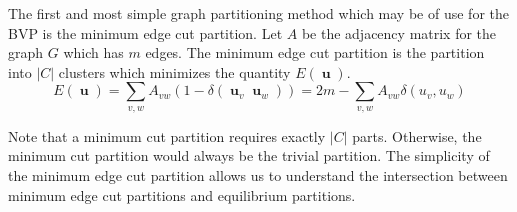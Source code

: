 \documentclass[]{article}
\DeclareMathOperator{\uu}{\mathbf{u}}
\begin{document}
		The first and most simple graph partitioning method which may be of use for the BVP is the minimum edge cut partition. 
		Let $A$ be the adjacency matrix for the graph $G$ which has $m$ edges. The minimum edge cut partition is the partition into $|C|$ clusters which minimizes the quantity $E(\uu)$. 
		\begin{equation}
			E(\uu) = \sum_{v,w}A_{vw}(1-\delta(\uu_v\uu_w))= 2m-\sum_{v,w}A_{vw}\delta(u_v,u_w)	\end{equation}
		
		Note that a minimum cut partition requires exactly $|C|$ parts. Otherwise, the minimum cut partition would always be the trivial partition. The simplicity of the minimum edge cut partition allows us to understand the intersection between minimum edge cut partitions and equilibrium partitions. 
\end{document}
